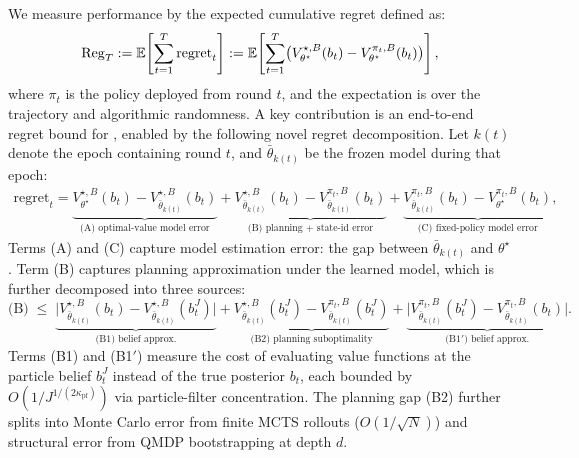 We measure performance by the expected cumulative regret defined as:
\begin{equation}\label{eq:regret_def_sec4}
\mathrm{Reg}_T := \mathbb{E}\!\left[\sum_{t=1}^T \text{regret}_t \right] :=\mathbb{E}\!\left[\sum_{t=1}^T\bigl(V_{\theta^\star}^{\star,B}(b_t)-V_{\theta^\star}^{\pi_t,B}(b_t)\bigr)\right],
\end{equation}
where $\pi_t$ is the policy deployed from round $t$, and the expectation is over the trajectory and algorithmic randomness. A key contribution is an end-to-end regret bound for , enabled by the following novel regret decomposition. Let $k(t)$ denote the epoch containing round $t$, and $\bar\theta_{k(t)}$ be the frozen model during that epoch:
\begin{align}
\text{regret}_t
=
\underbrace{V_{\theta^\star}^{\star,B}(b_t)-V_{\bar\theta_{k(t)}}^{\star,B}(b_t)}_{\text{(A) optimal-value model error}}
+
\underbrace{V_{\bar\theta_{k(t)}}^{\star,B}(b_t)-V_{\bar\theta_{k(t)}}^{\pi_t,B}(b_t)}_{\text{(B) planning + state-id error}}
+
\underbrace{V_{\bar\theta_{k(t)}}^{\pi_t,B}(b_t)-V_{\theta^\star}^{\pi_t,B}(b_t)}_{\text{(C) fixed-policy model error}}, \label{eq:main_decomp_round_t}
\end{align}
Terms (A) and (C) capture model estimation error: the gap between $\bar\theta_{k(t)}$ and $\theta^\star$. Term (B) captures planning approximation under the learned model, which is further decomposed into three sources:
\begin{equation}
 \text{(B)} \;\le\;
\underbrace{\bigl|V_{\bar\theta_{k(t)}}^{\star,B}(b_t)-V_{\bar\theta_{k(t)}}^{\star,B}(b_t^J)\bigr|}_{\text{(B1) belief approx.}}
+
\underbrace{V_{\bar\theta_{k(t)}}^{\star,B}(b_t^J)-V_{\bar\theta_{k(t)}}^{\pi_t,B}(b_t^J)}_{\text{(B2) planning suboptimality}}
+
\underbrace{\bigl|V_{\bar\theta_{k(t)}}^{\pi_t,B}(b_t^J)-V_{\bar \theta_{k(t)}}^{\pi_t,B}(b_t)\bigr|}_{\text{(B1$'$) belief approx.}}. \label{eq:B_decomp}
\end{equation}
Terms (B1) and (B1$'$) measure the cost of evaluating value functions at the particle belief $b_t^J$ instead of the true posterior $b_t$, each bounded by $O(1/J^{1/(2\kappa_{\mathrm{pf}})})$ via particle-filter concentration.
The planning gap (B2) further splits into Monte Carlo error from finite MCTS rollouts ($O(1/\sqrt{N})$) and structural error from QMDP bootstrapping at depth $d$.

